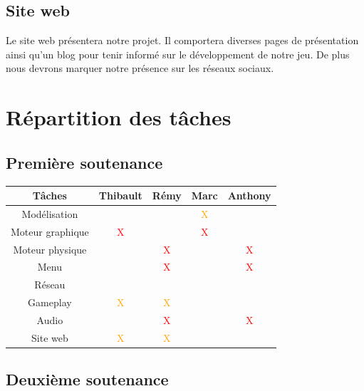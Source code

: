 \documentclass[a4paper, 11pt]{report}
\begin{document}
\subsection{Site web}\label{site-web}

Le site web présentera notre projet. Il comportera diverses pages de présentation ainsi qu'un blog pour tenir informé sur le développement de notre jeu. De plus nous devrons marquer notre présence sur les réseaux sociaux.

\newpage
\section{Répartition des tâches}\label{repartition-des-tuxe2ches}

\subsection{Première soutenance}\label{premiuxe8re-soutenance}

\begin{tabular}{ | c || c | c | c | c | }
\hline Tâches & Thibault & Rémy & Marc & Anthony \\
\hline Modélisation & & & \textcolor{orange}{X} & \\
\hline Moteur graphique & \textcolor{red}{X} & & \textcolor{red}{X} & \\
\hline Moteur physique & & \textcolor{red}{X} & & \textcolor{red}{X} \\
\hline Menu & & \textcolor{red}{X} & & \textcolor{red}{X} \\
\hline Réseau & & & & \\
\hline Gameplay & \textcolor{orange}{X} & \textcolor{orange}{X} & & \\
\hline Audio & & \textcolor{red}{X} & & \textcolor{red}{X} \\
\hline Site web & \textcolor{orange}{X} & \textcolor{orange}{X} & & \\
\hline
\end{tabular}

\subsection{Deuxième soutenance}\label{deuxiuxe8me-soutenance}
\end{document}
